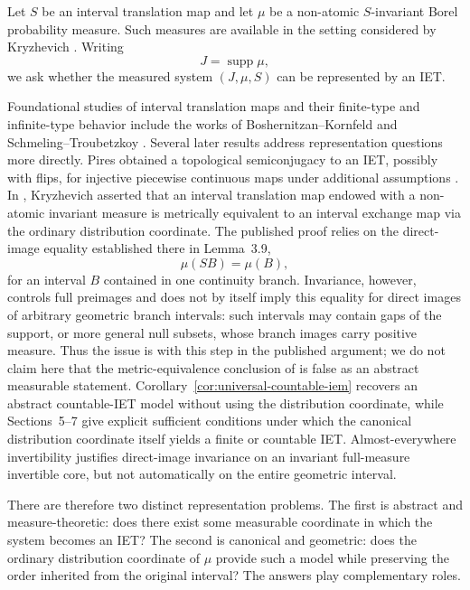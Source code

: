\documentclass[11pt]{amsart}
\theoremstyle{plain}
\theoremstyle{definition}
\theoremstyle{remark}
\DeclareMathOperator{\supp}{supp}
\begin{document}
Let \(S\) be an interval translation map and let \(\mu\) be a non-atomic
\(S\)-invariant Borel probability measure. Such measures are available in the setting
considered by Kryzhevich \cite{Kryzhevich2020}. Writing
\[
        J=\supp\mu,
\]
we ask whether the measured system \((J,\mu,S)\) can be represented by an IET.

Foundational studies of interval translation maps and their finite-type and
infinite-type behavior include the works of Boshernitzan--Kornfeld and
Schmeling--Troubetzkoy
\cite{BoshernitzanKornfeld1995,SchmelingTroubetzkoy2000}.
Several later results address representation questions more directly. Pires obtained a
topological semiconjugacy to an IET, possibly with flips, for injective
piecewise continuous maps under additional assumptions \cite{Pires2016}. In
\cite[Theorem~3.10]{Kryzhevich2020}, Kryzhevich asserted that an interval translation
map endowed with a non-atomic invariant measure is metrically equivalent to an interval
exchange map via the ordinary distribution coordinate. The published proof relies on the
direct-image equality established there in Lemma~3.9,
\[
        \mu(SB)=\mu(B),
\]
for an interval \(B\) contained in one continuity branch. Invariance, however, controls
full preimages and does not by itself imply this equality for direct images of arbitrary
geometric branch intervals: such intervals may contain gaps of the support, or more general
null subsets, whose branch images carry positive measure. Thus the issue is with this step in
the published argument; we do not claim here that the metric-equivalence conclusion of
\cite{Kryzhevich2020} is false as an abstract measurable statement. Corollary~\ref{cor:universal-countable-iem}
recovers an abstract countable-IET model without using the distribution coordinate, while
Sections~5--7 give explicit sufficient conditions under which the canonical distribution
coordinate itself yields a finite or countable IET. Almost-everywhere invertibility justifies
direct-image invariance on an invariant full-measure invertible core, but not automatically on
the entire geometric interval.

There are therefore two distinct representation problems. The first is abstract and
measure-theoretic: does there exist some measurable coordinate in which the system becomes an
IET? The second is canonical and geometric: does the ordinary
distribution coordinate of \(\mu\) provide such a model while preserving the order inherited
from the original interval? The answers play complementary roles.
\end{document}
